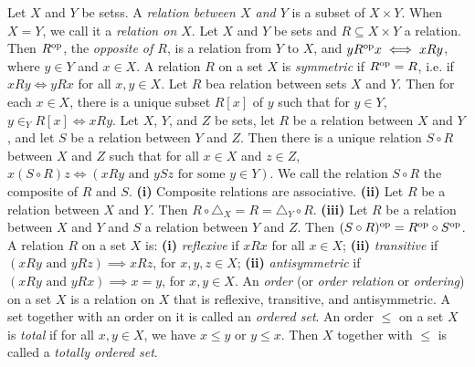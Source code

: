  Let $X$ and $Y$ be setss. A \textit{relation between $X$ and $Y$} is a subset of $X \times Y$. When $X = Y$, we call it a \textit{relation on $X$}.
 Let $X$ and $Y$ be sets and $R \subseteq X \times Y$ a relation. Then $R^{\operatorname{op}}$, the \textit{opposite of $R$}, is a relation from $Y$ to $X$, and $y R^{\operatorname{op}}x \iff xRy$, where $y \in Y$ and $x \in X$.
 A relation $R$ on a set $X$ is \textit{symmetric} if $R^{\operatorname{op}} = R$, i.e. if $xRy \iff yRx$ for all $x, y \in X$.
 Let $R$ bea  relation between sets $X$ and $Y$. Then for each $x \in X$, there is a unique subset $R[x]$ of $y$ such that for $y \in Y$, $y \in_Y R[x] \iff xRy$.
 Let $X$, $Y$, and $Z$ be sets, let $R$ be a relation between $X$ and $Y$, and let $S$ be a relation between $Y$ and $Z$. Then there is a unique relation $S \circ R$ between $X$ and $Z$ such that for all $x \in X$ and $z \in Z$, $x(S \circ R)z \iff (xRy \text{ and } ySz \text{ for some } y \in Y)$. We call the relation $S \circ R$ the composite of $R$ and $S$.
 \textbf{(i)} Composite relations are associative. \textbf{(ii)} Let $R$ be a relation between $X$ and $Y$. Then $R \circ \triangle_X = R = \triangle_Y \circ R$. \textbf{(iii)} Let $R$ be a relation between $X$ and $Y$ and $S$ a relation between $Y$ and $Z$. Then $(S \circ R)^{\operatorname{op}} = R^{\operatorname{op}} \circ S^{\operatorname{op}}$.
 A relation $R$ on a set $X$ is: \textbf{(i)} \textit{reflexive} if $xRx$ for all $x \in X$; \textbf{(ii)} \textit{transitive} if $(xRy \text{ and } yRz) \implies xRz$, for $x, y, z \in X$; \textbf{(ii)} \textit{antisymmetric} if $(xRy \text{ and } yRx) \implies x = y$, for $x, y \in X$.
 An \textit{order} (or \textit{order relation} or \textit{ordering}) on a set $X$ is a relation on $X$ that is reflexive, transitive, and antisymmetric. A set together with an order on it is called an \textit{ordered set}.
 An order $\leq$ on a set $X$ is \textit{total} if for all $x, y \in X$, we have $x \leq y$ or $y \leq x$. Then $X$ together with $\leq$ is called a \textit{totally ordered set}.
